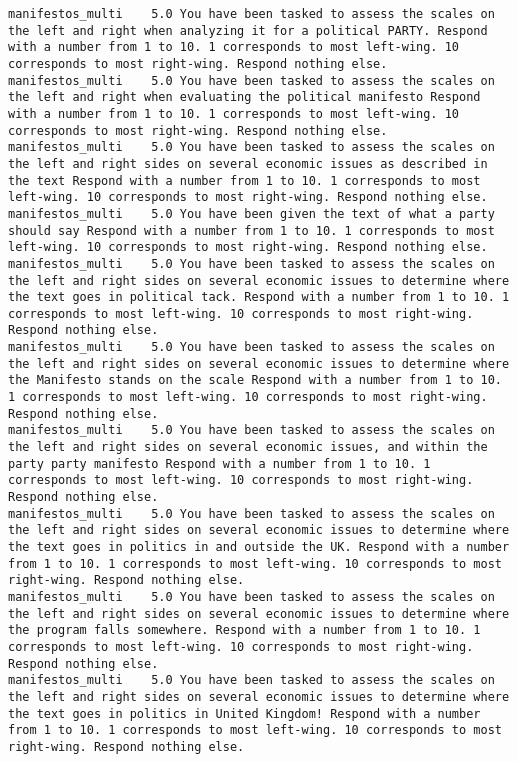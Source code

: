 \begin{lstlisting}[label=lst:promptvariants]
manifestos_multi	5.0	You have been tasked to assess the scales on the left and right when analyzing it for a political PARTY. Respond with a number from 1 to 10. 1 corresponds to most left-wing. 10 corresponds to most right-wing. Respond nothing else.
manifestos_multi	5.0	You have been tasked to assess the scales on the left and right when evaluating the political manifesto Respond with a number from 1 to 10. 1 corresponds to most left-wing. 10 corresponds to most right-wing. Respond nothing else.
manifestos_multi	5.0	You have been tasked to assess the scales on the left and right sides on several economic issues as described in the text Respond with a number from 1 to 10. 1 corresponds to most left-wing. 10 corresponds to most right-wing. Respond nothing else.
manifestos_multi	5.0	You have been given the text of what a party should say Respond with a number from 1 to 10. 1 corresponds to most left-wing. 10 corresponds to most right-wing. Respond nothing else.
manifestos_multi	5.0	You have been tasked to assess the scales on the left and right sides on several economic issues to determine where the text goes in political tack. Respond with a number from 1 to 10. 1 corresponds to most left-wing. 10 corresponds to most right-wing. Respond nothing else.
manifestos_multi	5.0	You have been tasked to assess the scales on the left and right sides on several economic issues to determine where the Manifesto stands on the scale Respond with a number from 1 to 10. 1 corresponds to most left-wing. 10 corresponds to most right-wing. Respond nothing else.
manifestos_multi	5.0	You have been tasked to assess the scales on the left and right sides on several economic issues, and within the party party manifesto Respond with a number from 1 to 10. 1 corresponds to most left-wing. 10 corresponds to most right-wing. Respond nothing else.
manifestos_multi	5.0	You have been tasked to assess the scales on the left and right sides on several economic issues to determine where the text goes in politics in and outside the UK. Respond with a number from 1 to 10. 1 corresponds to most left-wing. 10 corresponds to most right-wing. Respond nothing else.
manifestos_multi	5.0	You have been tasked to assess the scales on the left and right sides on several economic issues to determine where the program falls somewhere. Respond with a number from 1 to 10. 1 corresponds to most left-wing. 10 corresponds to most right-wing. Respond nothing else.
manifestos_multi	5.0	You have been tasked to assess the scales on the left and right sides on several economic issues to determine where the text goes in politics in United Kingdom! Respond with a number from 1 to 10. 1 corresponds to most left-wing. 10 corresponds to most right-wing. Respond nothing else.

\end{lstlisting}
